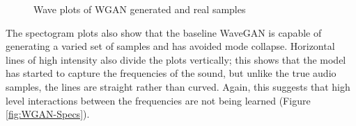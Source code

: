 \documentclass[a4paper, titlepage]{article}
\begin{document}
\begin{figure}[ht]%
    \centering
    \qquad
    \qquad
    \qquad
    \caption{Wave plots of WGAN generated and real samples}%
    \label{fig:WGAN-Waves}%
\end{figure}
%
\newline
The spectogram plots also show that the baseline WaveGAN is capable of generating a varied set of samples and has avoided mode collapse.
Horizontal lines of high intensity also divide the plots vertically; this shows that the model has started to capture the frequencies of the sound, but unlike the true audio samples, the lines are straight rather than curved.
Again, this suggests that high level interactions between the frequencies are not being learned (Figure \ref{fig:WGAN-Specs}).
\end{document}

